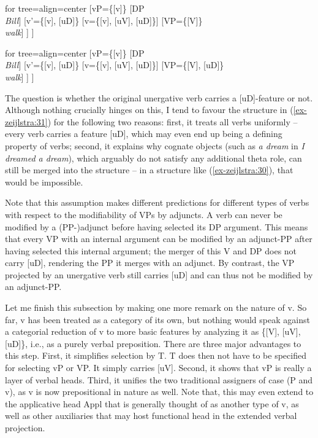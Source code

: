 \documentclass[output=paper
,modfonts
,nonflat]{langsci/langscibook}
\begin{document}
	\begin{exe}
		\ex\label{ex-zeijlstra:30}
			\begin{forest}	for tree={align=center}
				[vP{=}\{{[}v{]}\}
				[DP\\ \textit{Bill}]
				[v'{=}\{{[}v{]}{,} {[}uD{]}\}
				[v{=}\{{[}v{]}{,} {[}uV{]}{,} {[}uD{]}\}]
				[VP{=}\{{[}V{]}\}\\ \textit{walk}]
				] ]  
		\end{forest}
	\ex \label{ex-zeijlstra:31}
			\begin{forest} for tree={align=center}
				[vP{=}\{{[}v{]}\}
				[DP\\ \textit{Bill}]
				[v'{=}\{{[}v{]}{,} {[}uD{]}\}
				[v{=}\{{[}v{]}{,} {[}uV{]}{,} {[}uD{]}\}]
				[VP{=}\{{[}V{]}{,} {[}uD{]}\}\\ \textit{walk}]
				] ] 
		\end{forest}
	\end{exe}
\noindent The question is whether the original unergative verb carries a [uD]-feature or not. Although nothing crucially hinges on this, I tend to favour the structure in (\ref{ex-zeijlstra:31}) for the following two reasons: first, it treats all verbs uniformly – every verb carries a feature [uD], which may even end up being a defining property of verbs; second, it explains why cognate objects (such as \textit{a dream} in \textit{I dreamed a dream}), which arguably do not satisfy any additional theta role, can still be merged into the structure – in a structure like (\ref{ex-zeijlstra:30}), that would be impossible.

Note that this assumption makes different predictions for different types of verbs with respect to the modifiability of VPs by adjuncts. A verb can never be modified by a (PP-)adjunct before having selected its DP argument. This means that every VP with an internal argument can be modified by an adjunct-PP after having selected this internal argument; the merger of this V and DP does not carry [uD], rendering the PP it merges with an adjunct. By contrast, the VP projected by an unergative verb still carries [uD] and can thus not be modified by an adjunct-PP. 

Let me finish this subsection by making one more remark on the nature of v. So far, v has been treated as a category of its own, but nothing would speak against a categorial reduction of v to more basic features by analyzing it as \{[V], [uV], [uD]\}, i.e., as a purely verbal preposition. There are three major advantages to this step. First, it simplifies selection by T. T does then not have to be specified for selecting vP or VP. It simply carries [uV]. Second, it shows that vP is really a layer of verbal heads. Third, it unifies the two traditional assigners of case (P and v), as v is now prepositional in nature as well. Note that, this may even extend to the applicative head Appl that is generally thought of as another type of v, as well as other auxiliaries that may host functional head in the extended verbal projection.
\end{document}
